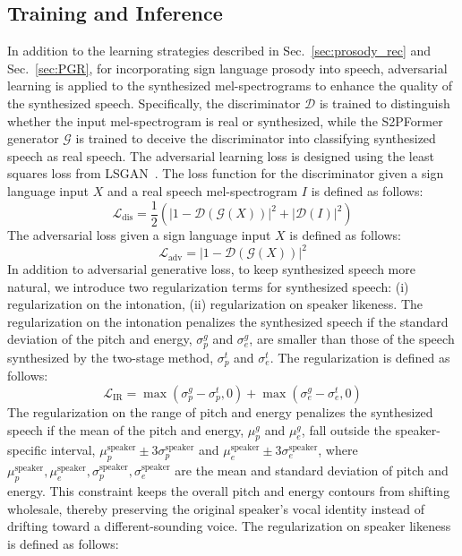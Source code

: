 \subsection{Training and Inference}
\label{sec:training_and_inference}
In addition to the learning strategies described in Sec.~\ref{sec:prosody_rec} and Sec.~\ref{sec:PGR}, for incorporating sign language prosody into speech, adversarial learning is applied to the synthesized mel-spectrograms to enhance the quality of the synthesized speech. Specifically, the discriminator $\mathcal{D}$ is trained to distinguish whether the input mel-spectrogram is real or synthesized, while the S2PFormer generator $\mathcal{G}$ is trained to deceive the discriminator into classifying synthesized speech as real speech. The adversarial learning loss is designed using the least squares loss from LSGAN~\cite{Mao_2017_ICCV}.
The loss function for the discriminator given a sign language input $X$ and a real speech mel-spectrogram $I$ is defined as follows:
\begin{equation}
    \mathcal{L}_{\mathrm{dis}} = \frac{1}{2}\left(|1 - \mathcal{D}(\mathcal{G}(X))|^2 + |\mathcal{D}(I)|^2\right)
\end{equation}
The adversarial loss given a sign language input $X$ is defined as follows:
\begin{equation}
    \mathcal{L}_{\mathrm{adv}} = |1 - \mathcal{D}(\mathcal{G}(X))|^2
\end{equation}
In addition to adversarial generative loss, to keep synthesized speech more natural, we introduce two regularization terms for synthesized speech: (i) regularization on the intonation, (ii) regularization on speaker likeness. The regularization on the intonation penalizes the synthesized speech if the standard deviation of the pitch and energy, $\sigma_{p}^{g}$ and $\sigma_{e}^{g}$, are smaller than those of the speech synthesized by the two-stage method, $\sigma_{p}^{t}$ and $\sigma_{e}^{t}$. The regularization is defined as follows:
\begin{equation}
    \mathcal{L}_{\mathrm{IR}} = \max(\sigma_{p}^{g} - \sigma_{p}^{t}, 0) + \max(\sigma_{e}^{g} - \sigma_{e}^{t}, 0)
\end{equation}
The regularization on the range of pitch and energy penalizes the synthesized speech if the mean of the pitch and energy, $\mu_{p}^{g}$ and $\mu_{e}^{g}$, fall outside the speaker-specific interval, $\mu_{p}^{\mathrm{speaker}} \pm 3\sigma_{p}^{\mathrm{speaker}}$ and $\mu_{e}^{\mathrm{speaker}} \pm 3\sigma_{e}^{\mathrm{speaker}}$, where $\mu_{p}^{\mathrm{speaker}}, \mu_{e}^{\mathrm{speaker}}, \sigma_{p}^{\mathrm{speaker}}, \sigma_{e}^{\mathrm{speaker}}$ are the mean and standard deviation of pitch and energy. This constraint keeps the overall pitch and energy contours from shifting wholesale, thereby preserving the original speaker’s vocal identity instead of drifting toward a different-sounding voice. The regularization on speaker likeness is defined as follows:
